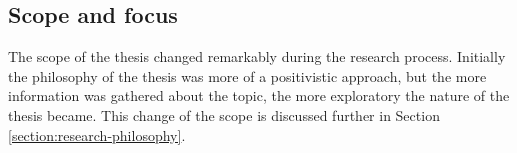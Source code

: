 \documentclass[english, 12pt, a4paper, sci, utf8, a-1b, online]{aaltothesis}
\begin{document}




\subsection{Scope and focus}

The scope of the thesis changed remarkably during the research process. Initially the philosophy of the thesis was more of a positivistic approach, but the more information was gathered about the topic, the more exploratory the nature of the thesis became. This change of the scope is discussed further in Section \ref{section:research-philosophy}.
\end{document}
